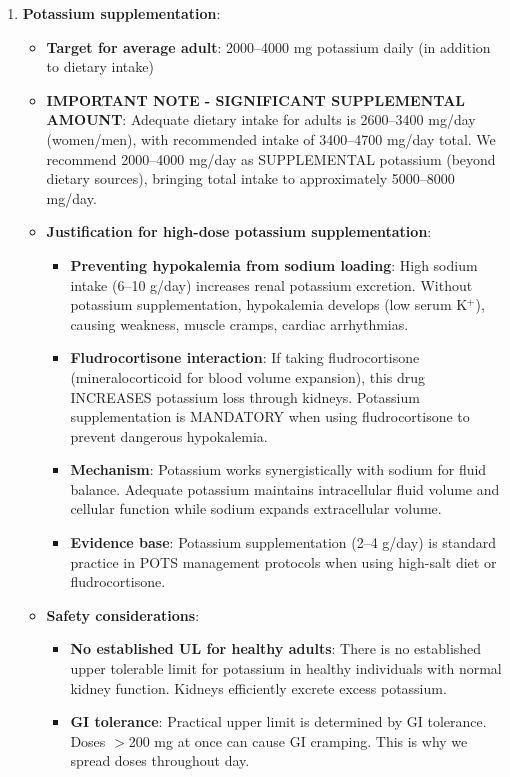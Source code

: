 \begin{enumerate}
    \item \textbf{Potassium supplementation}:
    \begin{itemize}
        \item \textbf{Target for average adult}: 2000--4000 mg potassium daily (in addition to dietary intake)
        \item \textbf{IMPORTANT NOTE - SIGNIFICANT SUPPLEMENTAL AMOUNT}: Adequate dietary intake for adults is 2600--3400 mg/day (women/men), with recommended intake of 3400--4700 mg/day total. We recommend 2000--4000 mg/day as SUPPLEMENTAL potassium (beyond dietary sources), bringing total intake to approximately 5000--8000 mg/day.
        \item \textbf{Justification for high-dose potassium supplementation}:
        \begin{itemize}
            \item \textbf{Preventing hypokalemia from sodium loading}: High sodium intake (6--10 g/day) increases renal potassium excretion. Without potassium supplementation, hypokalemia develops (low serum K$^{+}$), causing weakness, muscle cramps, cardiac arrhythmias.
            \item \textbf{Fludrocortisone interaction}: If taking fludrocortisone (mineralocorticoid for blood volume expansion), this drug INCREASES potassium loss through kidneys. Potassium supplementation is MANDATORY when using fludrocortisone to prevent dangerous hypokalemia.
            \item \textbf{Mechanism}: Potassium works synergistically with sodium for fluid balance. Adequate potassium maintains intracellular fluid volume and cellular function while sodium expands extracellular volume.
            \item \textbf{Evidence base}: Potassium supplementation (2--4 g/day) is standard practice in POTS management protocols when using high-salt diet or fludrocortisone.
        \end{itemize}
        \item \textbf{Safety considerations}:
        \begin{itemize}
            \item \textbf{No established UL for healthy adults}: There is no established upper tolerable limit for potassium in healthy individuals with normal kidney function. Kidneys efficiently excrete excess potassium.
            \item \textbf{GI tolerance}: Practical upper limit is determined by GI tolerance. Doses $>$200 mg at once can cause GI cramping. This is why we spread doses throughout day.

\end{itemize}
\end{itemize}
\end{enumerate}
